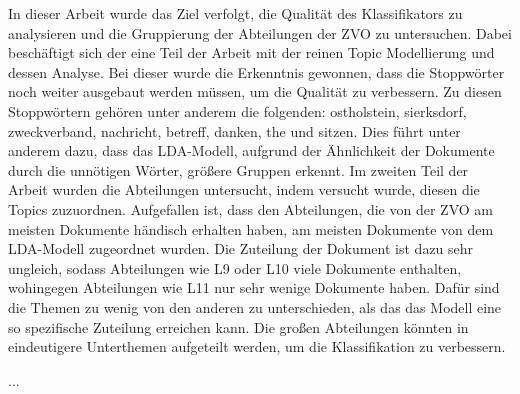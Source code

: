 \documentclass[german,version-2020-11]{uzl-thesis}
\begin{document}
\begin{itemize}
In dieser Arbeit wurde das Ziel verfolgt, die Qualität des Klassifikators zu analysieren und die Gruppierung der Abteilungen der ZVO zu untersuchen. Dabei beschäftigt sich der eine Teil der Arbeit mit der reinen Topic Modellierung und dessen Analyse. 
Bei dieser wurde die Erkenntnis gewonnen, dass die Stoppwörter noch weiter ausgebaut werden müssen, um die Qualität zu verbessern. Zu diesen Stoppwörtern gehören unter anderem die folgenden: ostholstein, sierksdorf, zweckverband, nachricht, betreff, danken, the und sitzen. Dies führt unter anderem dazu, dass das LDA-Modell, aufgrund der Ähnlichkeit der Dokumente durch die unnötigen Wörter, größere Gruppen erkennt. 
Im zweiten Teil der Arbeit wurden die Abteilungen untersucht, indem versucht wurde, diesen die Topics zuzuordnen. Aufgefallen ist, dass den Abteilungen, die von der ZVO am meisten Dokumente händisch erhalten haben, am meisten Dokumente von dem LDA-Modell zugeordnet wurden. Die Zuteilung der Dokument ist dazu sehr ungleich, sodass Abteilungen wie L9 oder L10 viele Dokumente enthalten, wohingegen Abteilungen wie L11 nur sehr wenige Dokumente haben. Dafür sind die Themen zu wenig von den anderen zu unterschieden, als das das Modell eine so spezifische Zuteilung erreichen kann. Die großen Abteilungen könnten in eindeutigere Unterthemen aufgeteilt werden, um die Klassifikation zu verbessern.  



%



...



%















\end{itemize}
\end{document}
